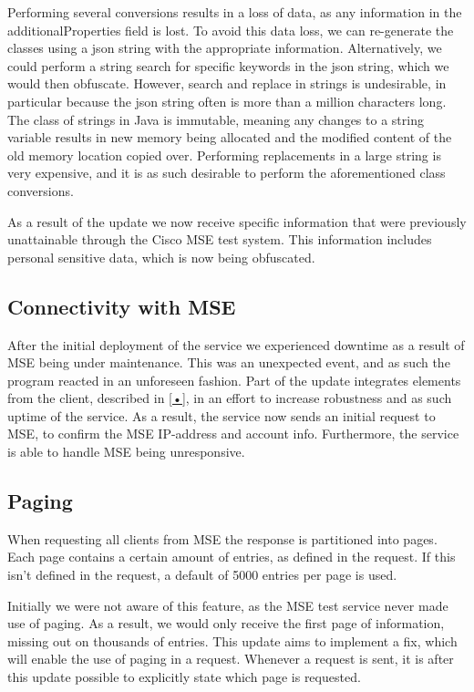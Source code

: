 Performing several conversions results in a loss of data, as any information in the additionalProperties field is lost. To avoid this data loss, we can re-generate the classes using a json string with the appropriate information. Alternatively, we could perform a string search for specific keywords in the json string, which we would then obfuscate. However, search and replace in strings is undesirable, in particular because the json string often is more than a million characters long. The class of strings in Java is immutable, meaning any changes to a string variable results in new memory being allocated and the modified content of the old memory location copied over. Performing replacements in a large string is very expensive, and it is as such desirable to perform the aforementioned class conversions. 

As a result of the update we now receive specific information that were previously unattainable through the Cisco MSE test system. This information includes personal sensitive data, which is now being obfuscated. 

\subsection{Connectivity with MSE}
After the initial deployment of the service we experienced downtime as a result of MSE being under maintenance. This was an unexpected event, and as such the program reacted in an unforeseen fashion. Part of the update integrates elements from the client, described in \ref{•}, in an effort to increase robustness and as such uptime of the service. As a result, the service now sends an initial request to MSE, to confirm the MSE IP-address and account info. Furthermore, the service is able to handle MSE being unresponsive.

\subsection{Paging}
When requesting all clients from MSE the response is partitioned into pages. Each page contains a certain amount of entries, as defined in the request. If this isn't defined in the request, a default of 5000 entries per page is used. 

Initially we were not aware of this feature, as the MSE test service never made use of paging. As a result, we would only receive the first page of information, missing out on thousands of entries. This update aims to implement a fix, which will enable the use of paging in a request. Whenever a request is sent, it is after this update possible to explicitly state which page is requested.